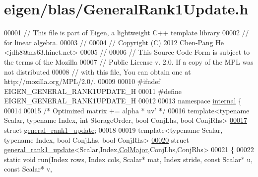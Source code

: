 \hypertarget{eigen_2blas_2_general_rank1_update_8h_source}{}\section{eigen/blas/\+General\+Rank1\+Update.h}
\label{eigen_2blas_2_general_rank1_update_8h_source}

\begin{DoxyCode}
00001 \textcolor{comment}{// This file is part of Eigen, a lightweight C++ template library}
00002 \textcolor{comment}{// for linear algebra.}
00003 \textcolor{comment}{//}
00004 \textcolor{comment}{// Copyright (C) 2012 Chen-Pang He <jdh8@ms63.hinet.net>}
00005 \textcolor{comment}{//}
00006 \textcolor{comment}{// This Source Code Form is subject to the terms of the Mozilla}
00007 \textcolor{comment}{// Public License v. 2.0. If a copy of the MPL was not distributed}
00008 \textcolor{comment}{// with this file, You can obtain one at http://mozilla.org/MPL/2.0/.}
00009 
00010 \textcolor{preprocessor}{#ifndef EIGEN\_GENERAL\_RANK1UPDATE\_H}
00011 \textcolor{preprocessor}{#define EIGEN\_GENERAL\_RANK1UPDATE\_H}
00012 
00013 \textcolor{keyword}{namespace }\hyperlink{namespaceinternal}{internal} \{
00014 
00015 \textcolor{comment}{/* Optimized matrix += alpha * uv' */}
00016 \textcolor{keyword}{template}<\textcolor{keyword}{typename} Scalar, \textcolor{keyword}{typename} Index, \textcolor{keywordtype}{int} StorageOrder, \textcolor{keywordtype}{bool} ConjLhs, \textcolor{keywordtype}{bool} ConjRhs>
\hyperlink{structinternal_1_1general__rank1__update}{00017} \textcolor{keyword}{struct }\hyperlink{structinternal_1_1general__rank1__update}{general\_rank1\_update};
00018 
00019 \textcolor{keyword}{template}<\textcolor{keyword}{typename} Scalar, \textcolor{keyword}{typename} Index, \textcolor{keywordtype}{bool} ConjLhs, \textcolor{keywordtype}{bool} ConjRhs>
\hyperlink{structinternal_1_1general__rank1__update_3_01_scalar_00_01_index_00_01_col_major_00_01_conj_lhs_00_01_conj_rhs_01_4}{00020} \textcolor{keyword}{struct }\hyperlink{structinternal_1_1general__rank1__update}{general\_rank1\_update}<Scalar,Index,\hyperlink{group__enums_ggaacded1a18ae58b0f554751f6cdf9eb13a0cbd4bdd0abcfc0224c5fcb5e4f6669a}{ColMajor},ConjLhs,ConjRhs>
00021 \{
00022   \textcolor{keyword}{static} \textcolor{keywordtype}{void} run(Index rows, Index cols, Scalar* mat, Index stride, \textcolor{keyword}{const} Scalar* u, \textcolor{keyword}{const} Scalar* v, 

\end{DoxyCode}
